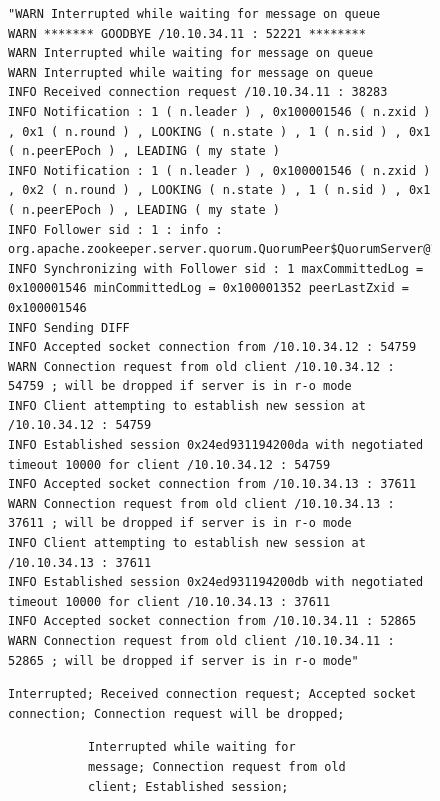 \documentclass[conference]{IEEEtran}
\begin{document}
\begin{figure}

\begin{lstlisting}[numbers=none, caption=Inferencing Zookeeper Log Example, label={lst:inference-zookeeper-log-example}]
"WARN Interrupted while waiting for message on queue
WARN ******* GOODBYE /10.10.34.11 : 52221 ********
WARN Interrupted while waiting for message on queue
WARN Interrupted while waiting for message on queue
INFO Received connection request /10.10.34.11 : 38283
INFO Notification : 1 ( n.leader ) , 0x100001546 ( n.zxid ) , 0x1 ( n.round ) , LOOKING ( n.state ) , 1 ( n.sid ) , 0x1 ( n.peerEPoch ) , LEADING ( my state )
INFO Notification : 1 ( n.leader ) , 0x100001546 ( n.zxid ) , 0x2 ( n.round ) , LOOKING ( n.state ) , 1 ( n.sid ) , 0x1 ( n.peerEPoch ) , LEADING ( my state )
INFO Follower sid : 1 : info : org.apache.zookeeper.server.quorum.QuorumPeer$QuorumServer@19b4ac28
INFO Synchronizing with Follower sid : 1 maxCommittedLog = 0x100001546 minCommittedLog = 0x100001352 peerLastZxid = 0x100001546
INFO Sending DIFF
INFO Accepted socket connection from /10.10.34.12 : 54759
WARN Connection request from old client /10.10.34.12 : 54759 ; will be dropped if server is in r-o mode
INFO Client attempting to establish new session at /10.10.34.12 : 54759
INFO Established session 0x24ed931194200da with negotiated timeout 10000 for client /10.10.34.12 : 54759
INFO Accepted socket connection from /10.10.34.13 : 37611
WARN Connection request from old client /10.10.34.13 : 37611 ; will be dropped if server is in r-o mode
INFO Client attempting to establish new session at /10.10.34.13 : 37611
INFO Established session 0x24ed931194200db with negotiated timeout 10000 for client /10.10.34.13 : 37611
INFO Accepted socket connection from /10.10.34.11 : 52865
WARN Connection request from old client /10.10.34.11 : 52865 ; will be dropped if server is in r-o mode"
\end{lstlisting}

\begin{lstlisting}[numbers=none, caption=Reference Summary, label={lst:reference-summary}]
Interrupted; Received connection request; Accepted socket connection; Connection request will be dropped;
\end{lstlisting}

\begin{subfigure}{\textwidth}
        
\begin{subfigure}[t]{0.5\textwidth}


\begin{lstlisting}[numbers=none, caption=ChatGPT 3.5 Summary (with similar logs/summaries provided in prompt), label={lst:gpt3-embed-summary}]
Interrupted while waiting for message; Connection request from old client; Established session;
\end{lstlisting}


\end{subfigure}
\end{subfigure}
\end{figure}
\end{document}
